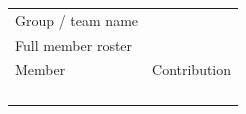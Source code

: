 \begin{tabularx}{\textwidth}{@{}p{}X@{}}
\toprule
Group / team name &  \\
Full member roster &  \\
\midrule
Member & Contribution \\
\midrule
\rule{0pt}{18pt} & \\
\rule{0pt}{18pt} & \\
\rule{0pt}{18pt} & \\
\rule{0pt}{18pt} & \\
\bottomrule
\end{tabularx}
